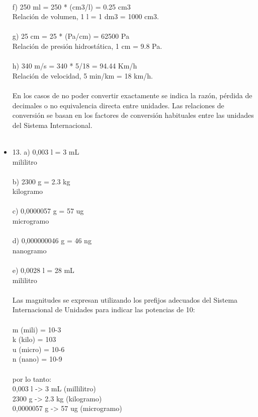 \documentclass{article}
\begin{document}
\begin{itemize}
\\
f) 250 ml = 250 * (cm3/l) = 0.25 cm3\\
Relación de volumen, 1 l = 1 dm3 = 1000 cm3.\\
\\
g) 25 cm = 25 * (Pa/cm) = 62500 Pa\\
Relación de presión hidrostática, 1 cm = 9.8 Pa.\\
\\
h) 340 m/s = 340 * 5/18 = 94.44 Km/h\\
Relación de velocidad, 5 min/km = 18 km/h.\\
\\
En los casos de no poder convertir exactamente se indica la razón, pérdida de decimales o no equivalencia directa entre unidades. Las relaciones de conversión se basan en los factores de conversión habituales entre las unidades del Sistema Internacional.\\
\\
\item{13.}
a) 0,003 l = 3 mL\\
mililitro\\
\\
b) 2300 g = 2.3 kg\\
kilogramo\\
\\
c) 0,0000057 g = 57 ug\\
microgramo\\
\\
d) 0,000000046 g = 46 ng\\
nanogramo\\
\\
e) 0,0028 l = 28 mL\\
mililitro\\
\\
Las magnitudes se expresan utilizando los prefijos adecuados del Sistema Internacional de Unidades para indicar las potencias de 10:\\
\\
m (mili) = 10-3\\
k (kilo) = 103\\
u (micro) = 10-6\\
n (nano) = 10-9\\
\\
por lo tanto:\\
0,003 l -> 3 mL (millilitro)\\
2300 g -> 2.3 kg (kilogramo)\\
0,0000057 g -> 57 ug (microgramo)\\

\end{itemize}
\end{document}
